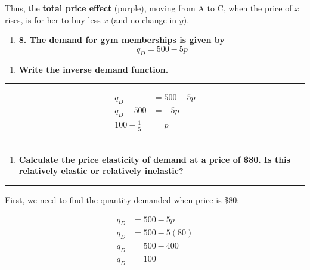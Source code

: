 \documentclass[
  11pt,
]{article}
\providecommand{\tightlist}{%
  \setlength{\itemsep}{0pt}\setlength{\parskip}{0pt}}
\begin{document}
Thus, the \textbf{total price effect} (purple), moving from A to C, when
the price of \(x\) rises, is for her to buy less \(x\) (and no change in
\(y)\).

\clearpage

\begin{enumerate}
\def\labelenumi{\arabic{enumi}.}
\setcounter{enumi}{7}
\tightlist
\item
  \textbf{8. The demand for gym memberships is given by} \[q_D=500-5p\]
\end{enumerate}

\begin{enumerate}
\def\labelenumi{\alph{enumi}.}
\tightlist
\item
  \textbf{Write the inverse demand function.}
\end{enumerate}

\begin{center}\rule{0.5\linewidth}{0.5pt}\end{center}

\[\begin{aligned}
    q_D&=500-5p\\
    q_D-500&=-5p\\
    100-\frac{1}{5}&=p\\
    \end{aligned}\]

\begin{center}\rule{0.5\linewidth}{0.5pt}\end{center}

\begin{enumerate}
\def\labelenumi{\alph{enumi}.}
\setcounter{enumi}{1}
\tightlist
\item
  \textbf{Calculate the price elasticity of demand at a price of \$80.
  Is this relatively elastic or relatively inelastic?}
\end{enumerate}

\begin{center}\rule{0.5\linewidth}{0.5pt}\end{center}

First, we need to find the quantity demanded when price is \$80:

\[\begin{aligned}
    q_D&=500-5p\\
    q_D&=500-5(80)\\
    q_D&=500-400\\
    q_D&=100\\
    \end{aligned}\]
\end{document}
